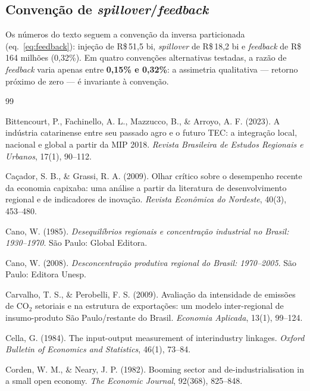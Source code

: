 \documentclass[11pt,a4paper]{article}
\begin{document}
\subsection{Convenção de \emph{spillover}/\emph{feedback}}
\label{ap:convencao}
Os números do texto seguem a convenção da inversa particionada
(eq.~\ref{eq:feedback}): injeção de R\$\,51,5 bi, \emph{spillover} de R\$\,18,2 bi e
\emph{feedback} de R\$\,164 milhões (0,32\%). Em quatro convenções alternativas testadas, a
razão de \emph{feedback} varia apenas entre \textbf{0,15\% e 0,32\%}: a assimetria
qualitativa --- retorno próximo de zero --- é invariante à convenção.

\begin{thebibliography}{99}

Bittencourt, P., Fachinello, A. L., Mazzucco, B., \& Arroyo, A. F. (2023). A indústria
catarinense entre seu passado agro e o futuro TEC: a integração local, nacional e global
a partir da MIP 2018. \textit{Revista Brasileira de Estudos Regionais e Urbanos}, 17(1),
90--112.

Caçador, S. B., \& Grassi, R. A. (2009). Olhar crítico sobre o desempenho recente da
economia capixaba: uma análise a partir da literatura de desenvolvimento regional e de
indicadores de inovação. \textit{Revista Econômica do Nordeste}, 40(3), 453--480.

Cano, W. (1985). \textit{Desequilíbrios regionais e concentração industrial no Brasil:
1930--1970}. São Paulo: Global Editora.

Cano, W. (2008). \textit{Desconcentração produtiva regional do Brasil: 1970--2005}.
São Paulo: Editora Unesp.

Carvalho, T. S., \& Perobelli, F. S. (2009). Avaliação da intensidade de emissões de CO$_2$
setoriais e na estrutura de exportações: um modelo inter-regional de insumo-produto São
Paulo/restante do Brasil. \textit{Economia Aplicada}, 13(1), 99--124.

Cella, G. (1984). The input-output measurement of interindustry linkages.
\textit{Oxford Bulletin of Economics and Statistics}, 46(1), 73--84.

Corden, W. M., \& Neary, J. P. (1982). Booming sector and de-industrialisation in a small
open economy. \textit{The Economic Journal}, 92(368), 825--848.


\end{thebibliography}
\end{document}
